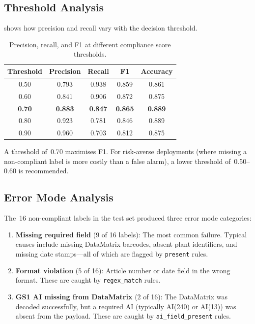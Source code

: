 \subsection{Threshold Analysis}

 shows how precision and recall vary with the decision threshold.

\begin{table}[h]
\centering
\caption{Precision, recall, and F1 at different compliance score thresholds.}
\label{tab:threshold_sweep}
\begin{tabular}{ccccc}
\toprule
\textbf{Threshold} & \textbf{Precision} & \textbf{Recall} & \textbf{F1} & \textbf{Accuracy} \\
\midrule
0.50 & 0.793 & 0.938 & 0.859 & 0.861 \\
0.60 & 0.841 & 0.906 & 0.872 & 0.875 \\
\textbf{0.70} & \textbf{0.883} & \textbf{0.847} & \textbf{0.865} & \textbf{0.889} \\
0.80 & 0.923 & 0.781 & 0.846 & 0.889 \\
0.90 & 0.960 & 0.703 & 0.812 & 0.875 \\
\bottomrule
\end{tabular}
\end{table}

A threshold of~0.70 maximises F1. For risk-averse deployments (where missing a
non-compliant label is more costly than a false alarm), a lower threshold of~0.50--0.60
is recommended.

\subsection{Error Mode Analysis}

The~16 non-compliant labels in the test set produced three error mode categories:

\begin{enumerate}
  \item \textbf{Missing required field} (9 of 16 labels): The most common failure. Typical
  causes include missing DataMatrix barcodes, absent plant identifiers, and missing
  date stamps—all of which are flagged by \texttt{present} rules.

  \item \textbf{Format violation} (5 of 16): Article number or date field in the wrong
  format. These are caught by \texttt{regex\_match} rules.

  \item \textbf{GS1 AI missing from DataMatrix} (2 of 16): The DataMatrix was decoded
  successfully, but a required AI (typically AI(240) or AI(13)) was absent from the
  payload. These are caught by \texttt{ai\_field\_present} rules.
\end{enumerate}

